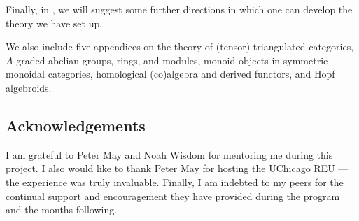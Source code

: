 \documentclass[../main.tex]{subfiles}
\begin{document}
Finally, in , we will suggest some further directions in which one can develop the theory we have set up.

We also include five appendices on the theory of (tensor) triangulated categories, $A$-graded abelian groups, rings, and modules, monoid objects in symmetric monoidal categories, homological (co)algebra and derived functors, and Hopf algebroids.

\subsection{Acknowledgements}

I am grateful to Peter May and Noah Wisdom for mentoring me during this project. I also would like to thank Peter May for hosting the UChicago REU --- the experience was truly invaluable. Finally, I am indebted to my peers for the continual support and encouragement they have provided during the program and the months following.
\end{document}
